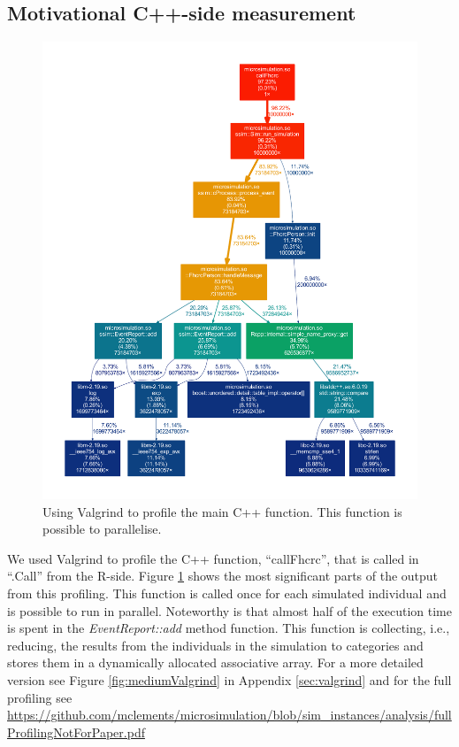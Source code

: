 \subsection{Motivational C++-side measurement}
\begin{figure}[!htbp] \centering
  \includegraphics[height=0.70\textheight]{images/simpleMotivatingValgrind.pdf}
  \caption{Using Valgrind to profile the main C++ function. This
    function is possible to parallelise.}
  \label{fig:cppMot}
\end{figure}
We used Valgrind to profile the C++ function, ``callFhcrc'', that is
called in ``.Call'' from the R-side. Figure \ref{fig:cppMot} shows the
most significant parts of the output from this profiling. This
function is called once for each simulated individual and is possible
to run in parallel. Noteworthy is that almost half of the execution
time is spent in the \emph{EventReport::add} method function. This
function is collecting, i.e., reducing, the results from the
individuals in the simulation to categories and stores them in a
dynamically allocated associative array. For a more detailed version
see Figure \ref{fig:mediumValgrind} in Appendix \ref{sec:valgrind} and
for the full profiling see \url{https://github.com/mclements/microsimulation/blob/sim_instances/analysis/fullProfilingNotForPaper.pdf}

